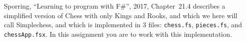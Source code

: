 Sporring, ``Learning to program with F\#'', 2017, Chapter~21.4 describes a simplified version of Chess with only Kings and Rooks, and which we here will call Simplechess, and which is implemented in 3 files: \lstinline{chess.fs}, \lstinline{pieces.fs}, and \lstinline{chessApp.fsx}. In this assignment you are to work with this implementation.
